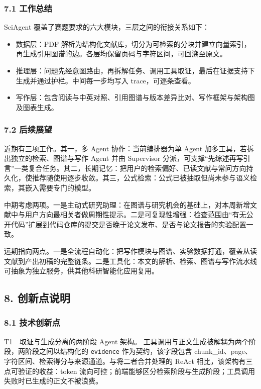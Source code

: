 \documentclass[UTF8,fontset=windows,zihao=5,a4paper]{ctexart}
\begin{document}
\subsubsection*{7.1 工作总结}
SciAgent 覆盖了赛题要求的六大模块，三层之间的衔接关系如下：

\begin{itemize}
\item 数据层：PDF 解析为结构化文献库，切分为可检索的分块并建立向量索引，再生成引用图谱的边。各层均保留页码与字符区间，可回溯至原文。
\item 推理层：问题先经意图路由，再拆解任务、调用工具取证，最后在证据支持下生成并通过护栏。中间每一步均写入 trace，可逐条查看。
\item 写作层：包含阅读与中英对照、引用图谱与版本差异比对、写作框架与架构图及图表生成。
\end{itemize}

\subsubsection*{7.2 后续展望}
近期有三项工作。其一，多 Agent 协作：当前编排器为单 Agent 加多工具，若拆出独立的检索、图谱与写作 Agent 并由 Supervisor 分派，可支撑“先综述再写引言”一类复合任务。其二，长期记忆：把用户的检索偏好、已读文献与常问方向持久化，使推荐随使用逐步收敛。其三，公式检索：公式已被抽取但尚未参与语义检索，其嵌入需要专门的模型。

中期考虑两项。一是主动式研究助理：在图谱与研究机会的基础上，对本周新增文献中与用户方向最相关者做周期性提示。二是可复现性增强：检查范围由“有无公开代码”扩展到代码仓库的提交是否晚于论文发布、是否与论文报告的实验配置一致。

远期指向两点。一是全流程自动化：把写作模块与图谱、实验数据打通，覆盖从读文献到产出初稿的完整链条。二是工具化：本文的解析、检索、图谱与写作流水线可抽象为独立服务，供其他科研智能化应用复用。

\subsection*{8. 创新点说明}
\subsubsection*{8.1 技术创新点}
T1　取证与生成分离的两阶段 Agent 架构。 工具调用与正文生成被解耦为两个阶段，两阶段之间以结构化的 \texttt{evidence} 作为契约，该字段包含 chunk\_\allowbreak{}id、page、字符区间、检索得分与来源通道。与将二者合并处理的 ReAct 相比，该架构有三点可验证的收益：token 流向可控；前端能够区分检索阶段与生成阶段；工具调用失败时已生成的正文不被浪费。
\end{document}
